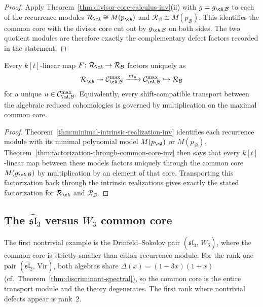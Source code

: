 \begin{proof}
Apply Theorem~\ref{thm:divisor-core-calculus-inv}(ii) with
$g = g_{\cA,\mathcal{B}}$ to each of the recurrence modules
$\mathcal{R}_\cA \cong M(p_\cA)$ and
$\mathcal{R}_\mathcal{B} \cong M(p_\mathcal{B})$.
This identifies the common core with the divisor core cut out by
$g_{\cA,\mathcal{B}}$ on both sides.
The two quotient modules are therefore exactly the complementary
defect factors recorded in the statement.
\end{proof}

\begin{proposition}
\label{prop:transport-factors-inv}
Every $k[t]$-linear map
$F \colon \mathcal{R}_\cA \to \mathcal{R}_\mathcal{B}$
factors uniquely as
\[
\mathcal{R}_\cA
 \twoheadrightarrow
 \mathcal{C}^{\max}_{\cA,\mathcal{B}}
 \xrightarrow{\;m_u\;}
 \mathcal{C}^{\max}_{\cA,\mathcal{B}}
 \hookrightarrow
 \mathcal{R}_\mathcal{B}
\]
for a unique $u \in \mathcal{C}^{\max}_{\cA,\mathcal{B}}$.
Equivalently, every shift-compatible transport between the
algebraic reduced cohomologies is governed by multiplication
on the maximal common core.
\end{proposition}

\begin{proof}
Theorem~\ref{thm:minimal-intrinsic-realization-inv} identifies each
recurrence module with its minimal polynomial model
$M(p_\cA)$ or $M(p_\mathcal{B})$.
Theorem~\ref{thm:factorization-through-common-core-inv} then says that
every $k[t]$-linear map between these models factors uniquely through
the common core $M(g_{\cA,\mathcal{B}})$ by multiplication by an
element of that core.
Transporting this factorization back through the intrinsic
realizations gives exactly the stated factorization for
$\mathcal{R}_\cA$ and $\mathcal{R}_\mathcal{B}$.
\end{proof}

\subsection{The \texorpdfstring{$\widehat{\mathfrak{sl}}_3$
 versus $W_3$}{sl3-hat vs W3} common core}
\label{subsec:sl3-w3-example}

The first nontrivial example is the Drinfeld--Sokolov pair
$(\widehat{\mathfrak{sl}}_3,\,W_3)$, where the common core
is strictly smaller than either recurrence module. For the
rank-one pair $(\widehat{\mathfrak{sl}}_2,\,
\mathrm{Vir})$, both algebras share
$\Delta(x) = (1-3x)(1+x)$
(cf.~Theorem~\ref{thm:discriminant-spectral}), so the
common core is the entire transport module and the theory
degenerates. The first rank where nontrivial defects appear
is rank~$2$.


